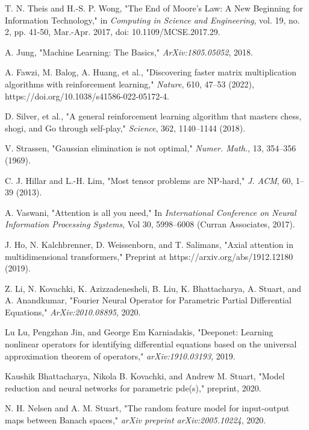 \documentclass[conference]{IEEEtran}
\begin{document}
\begin{thebibliography}{00}
 T. N. Theis and H.-S. P. Wong, "The End of Moore's Law: A New Beginning for Information Technology," in \textit{Computing in Science and Engineering}, vol. 19, no. 2, pp. 41-50, Mar.-Apr. 2017, doi: 10.1109/MCSE.2017.29.

 A. Jung, "Machine Learning: The Basics," \textit{ArXiv:1805.05052}, 2018.

 A. Fawzi, M. Balog, A. Huang, et al., "Discovering faster matrix multiplication algorithms with reinforcement learning," \textit{Nature}, 610, 47–53 (2022), https://doi.org/10.1038/s41586-022-05172-4.

 D. Silver, et al., "A general reinforcement learning algorithm that masters chess, shogi, and Go through self-play," \textit{Science}, 362, 1140–1144 (2018).

 V. Strassen, "Gaussian elimination is not optimal," \textit{Numer. Math.}, 13, 354–356 (1969).

 C. J. Hillar and L.-H. Lim, "Most tensor problems are NP-hard," \textit{J. ACM}, 60, 1–39 (2013).

 A. Vaswani, "Attention is all you need," In \textit{International Conference on Neural Information Processing Systems}, Vol 30, 5998–6008 (Curran Associates, 2017).

 J. Ho, N. Kalchbrenner, D. Weissenborn, and T. Salimans, "Axial attention in multidimensional transformers," Preprint at https://arxiv.org/abs/1912.12180 (2019).

 Z. Li, N. Kovachki, K. Azizzadenesheli, B. Liu, K. Bhattacharya, A. Stuart, and A. Anandkumar, "Fourier Neural Operator for Parametric Partial Differential Equations," \textit{ArXiv:2010.08895}, 2020.

 Lu Lu, Pengzhan Jin, and George Em Karniadakis, "Deeponet: Learning nonlinear operators for identifying differential equations based on the universal approximation theorem of operators," \textit{arXiv:1910.03193}, 2019.

 Kaushik Bhattacharya, Nikola B. Kovachki, and Andrew M. Stuart, "Model reduction and neural networks for parametric pde(s)," preprint, 2020.

 N. H. Nelsen and A. M. Stuart, "The random feature model for input-output maps between Banach spaces," \textit{arXiv preprint arXiv:2005.10224}, 2020.


\end{thebibliography}
\end{document}
